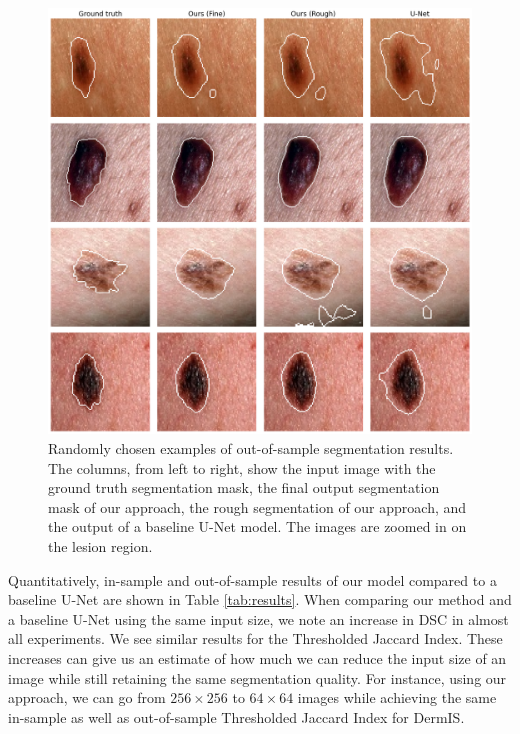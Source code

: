 \begin{figure}[h]
\centering
\includegraphics[width=\textwidth]{images/5/e2e/visual_results.png}
\caption{Randomly chosen examples of out-of-sample segmentation results. The columns, from left to right, show the input image with the ground truth segmentation mask, the final output segmentation mask of our approach, the rough segmentation of our approach, and the output of a baseline U-Net model. The images are zoomed in on the lesion region.} \label{fig:visual}
\end{figure}

Quantitatively, in-sample and out-of-sample results of our model compared to a baseline U-Net are shown in Table \ref{tab:results}. When comparing our method and a baseline U-Net using the same input size, we note an increase in DSC in almost all experiments. We see similar results for the Thresholded Jaccard Index. These increases can give us an estimate of how much we can reduce the input size of an image while still retaining the same segmentation quality. For instance, using our approach, we can go from $256 \times 256$ to $64 \times 64$ images while achieving the same in-sample as well as out-of-sample Thresholded Jaccard Index for DermIS.


